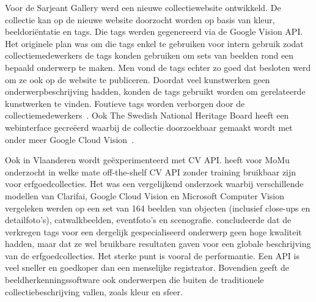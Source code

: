 Voor de Sarjeant Gallery werd een nieuwe collectiewebsite ontwikkeld. De collectie kan op de nieuwe website doorzocht worden op basis van kleur, beeldoriëntatie en tags. Die tags werden gegenereerd via de Google Vision API. Het originele plan was om die tags enkel te gebruiken voor intern gebruik zodat collectiemedewerkers de tags konden gebruiken om sets van beelden rond een bepaald onderwerp te maken. Men vond de tags echter zo goed dat besloten werd om ze ook op de website te publiceren. Doordat veel kunstwerken geen onderwerpbeschrijving hadden, konden de tags gebruikt worden om gerelateerde kunstwerken te vinden. Foutieve tags worden verborgen door de collectiemedewerkers~\autocite{Rowe2017}. Ook The Swedish National Heritage Board heeft een webinterface gecreëerd waarbij de collectie doorzoekbaar gemaakt wordt met onder meer Google Cloud Vision~\autocite{Haskiya2019}.

Ook in Vlaanderen wordt ge\"{e}xperimenteerd met CV API. \textcite{Vanstappen2019} heeft voor MoMu onderzocht in welke mate off-the-shelf CV API zonder training bruikbaar zijn voor erfgoedcollecties. Het was een vergelijkend onderzoek waarbij verschillende modellen van Clarifai, Google Cloud Vision en Microsoft Computer Vision vergeleken werden op een set van 164 beelden van objecten (inclusief close-ups en detailfoto’s), catwalkbeelden, eventfoto’s en scenografie. \textcite{Vanstappen2019} concludeerde dat de verkregen tags voor een dergelijk gespecialiseerd onderwerp geen hoge kwaliteit hadden, maar dat ze wel bruikbare resultaten gaven voor een globale beschrijving van de erfgoedcollecties. Het sterke punt is vooral de performantie. Een API is veel sneller en goedkoper dan een menselijke registrator. Bovendien geeft de beeldherkenningssoftware ook onderwerpen die buiten de traditionele collectiebeschrijving vallen, zoals kleur en sfeer.
